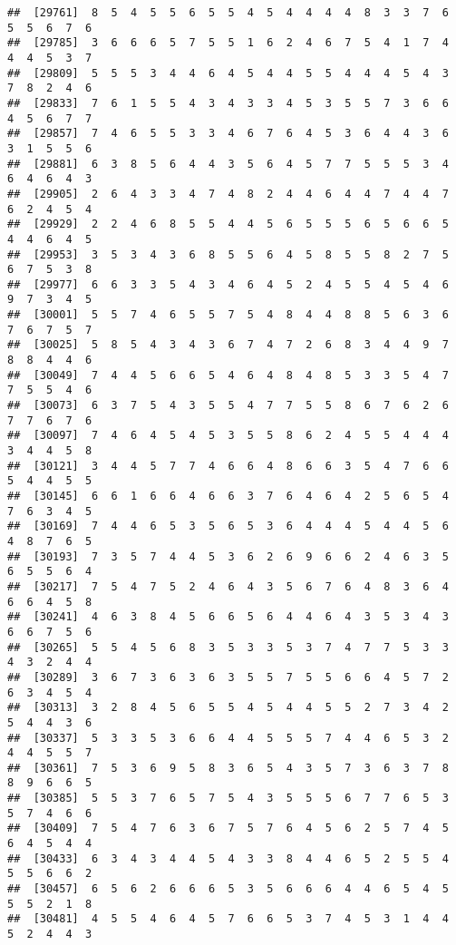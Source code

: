 \documentclass[
]{book}
\begin{document}
\begin{verbatim}
##  [29761]  8  5  4  5  5  6  5  5  4  5  4  4  4  4  8  3  3  7  6  5  5  6  7  6
##  [29785]  3  6  6  6  5  7  5  5  1  6  2  4  6  7  5  4  1  7  4  4  4  5  3  7
##  [29809]  5  5  5  3  4  4  6  4  5  4  4  5  5  4  4  4  5  4  3  7  8  2  4  6
##  [29833]  7  6  1  5  5  4  3  4  3  3  4  5  3  5  5  7  3  6  6  4  5  6  7  7
##  [29857]  7  4  6  5  5  3  3  4  6  7  6  4  5  3  6  4  4  3  6  3  1  5  5  6
##  [29881]  6  3  8  5  6  4  4  3  5  6  4  5  7  7  5  5  5  3  4  6  4  6  4  3
##  [29905]  2  6  4  3  3  4  7  4  8  2  4  4  6  4  4  7  4  4  7  6  2  4  5  4
##  [29929]  2  2  4  6  8  5  5  4  4  5  6  5  5  5  6  5  6  6  5  4  4  6  4  5
##  [29953]  3  5  3  4  3  6  8  5  5  6  4  5  8  5  5  8  2  7  5  6  7  5  3  8
##  [29977]  6  6  3  3  5  4  3  4  6  4  5  2  4  5  5  4  5  4  6  9  7  3  4  5
##  [30001]  5  5  7  4  6  5  5  7  5  4  8  4  4  8  8  5  6  3  6  7  6  7  5  7
##  [30025]  5  8  5  4  3  4  3  6  7  4  7  2  6  8  3  4  4  9  7  8  8  4  4  6
##  [30049]  7  4  4  5  6  6  5  4  6  4  8  4  8  5  3  3  5  4  7  7  5  5  4  6
##  [30073]  6  3  7  5  4  3  5  5  4  7  7  5  5  8  6  7  6  2  6  7  7  6  7  6
##  [30097]  7  4  6  4  5  4  5  3  5  5  8  6  2  4  5  5  4  4  4  3  4  4  5  8
##  [30121]  3  4  4  5  7  7  4  6  6  4  8  6  6  3  5  4  7  6  6  5  4  4  5  5
##  [30145]  6  6  1  6  6  4  6  6  3  7  6  4  6  4  2  5  6  5  4  7  6  3  4  5
##  [30169]  7  4  4  6  5  3  5  6  5  3  6  4  4  4  5  4  4  5  6  4  8  7  6  5
##  [30193]  7  3  5  7  4  4  5  3  6  2  6  9  6  6  2  4  6  3  5  6  5  5  6  4
##  [30217]  7  5  4  7  5  2  4  6  4  3  5  6  7  6  4  8  3  6  4  6  6  4  5  8
##  [30241]  4  6  3  8  4  5  6  6  5  6  4  4  6  4  3  5  3  4  3  6  6  7  5  6
##  [30265]  5  5  4  5  6  8  3  5  3  3  5  3  7  4  7  7  5  3  3  4  3  2  4  4
##  [30289]  3  6  7  3  6  3  6  3  5  5  7  5  5  6  6  4  5  7  2  6  3  4  5  4
##  [30313]  3  2  8  4  5  6  5  5  4  5  4  4  5  5  2  7  3  4  2  5  4  4  3  6
##  [30337]  5  3  3  5  3  6  6  4  4  5  5  5  7  4  4  6  5  3  2  4  4  5  5  7
##  [30361]  7  5  3  6  9  5  8  3  6  5  4  3  5  7  3  6  3  7  8  8  9  6  6  5
##  [30385]  5  5  3  7  6  5  7  5  4  3  5  5  5  6  7  7  6  5  3  5  7  4  6  6
##  [30409]  7  5  4  7  6  3  6  7  5  7  6  4  5  6  2  5  7  4  5  6  4  5  4  4
##  [30433]  6  3  4  3  4  4  5  4  3  3  8  4  4  6  5  2  5  5  4  5  5  6  6  2
##  [30457]  6  5  6  2  6  6  6  5  3  5  6  6  6  4  4  6  5  4  5  5  5  2  1  8
##  [30481]  4  5  5  4  6  4  5  7  6  6  5  3  7  4  5  3  1  4  4  5  2  4  4  3

\end{verbatim}
\end{document}
